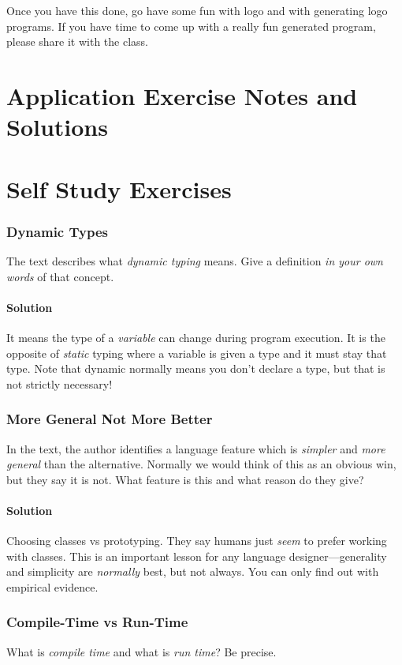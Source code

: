 \documentclass[twoside=false, DIV=14]{scrartcl}
\begin{document}
Once you have this done, go have some fun with logo and with generating logo programs.  If you have time to come up with a really fun generated program, please share it with the class.

\newpage

\newpage
\part*{Application Exercise Notes and Solutions}

\newpage
\part*{Self Study Exercises}

\section*{Dynamic Types}
The text describes what \emph{dynamic typing} means. Give a definition \emph{in your own words} of that concept.

\subsection*{Solution}
It means the type of a \emph{variable} can change during program execution. It is the opposite of \emph{static} typing where a variable is given a type and it must stay that type. Note that dynamic normally means you don't declare a type, but that is not strictly necessary!

\section*{More General Not More Better}
In the text, the author identifies a language feature which is \emph{simpler} and \emph{more general} than the alternative. Normally we would think of this as an obvious win, but they say it is not. What feature is this and what reason do they give?

\subsection*{Solution}
Choosing classes vs prototyping. They say humans just \emph{seem} to prefer working with classes. This is an important lesson for any language designer—generality and simplicity are \emph{normally} best, but not always. You can only find out with empirical evidence.

\section*{Compile-Time vs Run-Time}
What is \emph{compile time} and what is \emph{run time}? Be precise.
\end{document}
